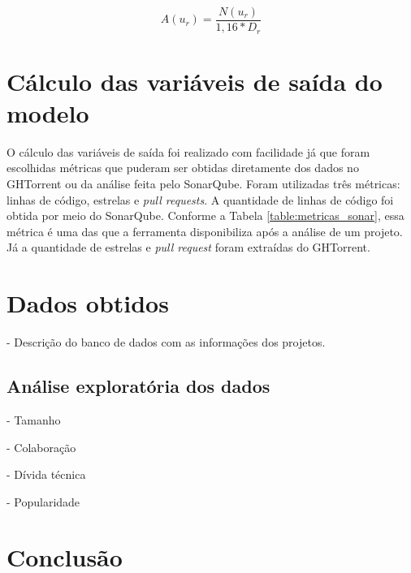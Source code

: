 \begin{equation}
\label{eq:cap_calculo_assiduidade}
A(u_r) =  \frac{N(u_r)}{1,16 * D_r}
\end{equation}


\section{Cálculo das variáveis de saída do modelo}

O cálculo das variáveis de saída foi realizado com facilidade já que foram escolhidas métricas que puderam ser obtidas diretamente dos dados no GHTorrent ou da análise feita pelo SonarQube. Foram utilizadas três métricas: linhas de código, estrelas e \textit{pull requests}.  A quantidade de linhas de código foi obtida por meio do SonarQube. Conforme a Tabela \ref{table:metricas_sonar}, essa métrica é uma das que a ferramenta disponibiliza após a análise de um projeto. Já a quantidade de estrelas e \textit{pull request} foram extraídas do GHTorrent. 


\section{Dados obtidos}

- Descrição do banco de dados com as informações dos projetos.


\subsection{Análise exploratória dos dados}

- Tamanho

- Colaboração

- Dívida técnica

- Popularidade



\section{Conclusão}




